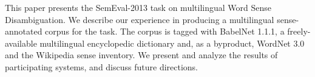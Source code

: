 This paper presents the SemEval-2013 task on multilingual Word Sense Disambiguation. We describe our experience in producing a multilingual
 sense-annotated corpus for the task. The corpus is tagged with BabelNet 1.1.1,
 a freely-available multilingual encyclopedic dictionary and, as a byproduct,
 WordNet 3.0 and the Wikipedia sense inventory. We present and analyze the
 results of participating systems, and discuss future directions.

